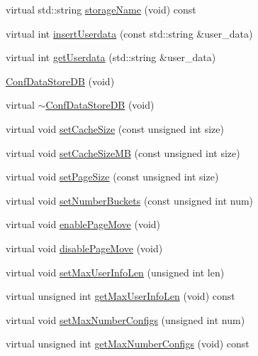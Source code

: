 \begin{DoxyCompactItemize}
virtual std\+::string \mbox{\hyperlink{classFILEDB_1_1ConfDataStoreDB_acac74e3143398de6c5da068f37a762ee}{storage\+Name}} (void) const
\item 
virtual int \mbox{\hyperlink{classFILEDB_1_1ConfDataStoreDB_a8fa05198f3ff1f405fbdfc6a51f43d1a}{insert\+Userdata}} (const std\+::string \&user\+\_\+data)
\item 
virtual int \mbox{\hyperlink{classFILEDB_1_1ConfDataStoreDB_abf7ce0847e1d68f960836826d68c0079}{get\+Userdata}} (std\+::string \&user\+\_\+data)
\item 
\mbox{\hyperlink{classFILEDB_1_1ConfDataStoreDB_a575d901daeccae08bcda5b2a60681e1b}{Conf\+Data\+Store\+DB}} (void)
\item 
virtual \mbox{\hyperlink{classFILEDB_1_1ConfDataStoreDB_a39b48750dbc9bd0d4ca8c9787edee897}{$\sim$\+Conf\+Data\+Store\+DB}} (void)
\item 
virtual void \mbox{\hyperlink{classFILEDB_1_1ConfDataStoreDB_af432d4a9c6dfb21a6ccb1969343cb4fa}{set\+Cache\+Size}} (const unsigned int size)
\item 
virtual void \mbox{\hyperlink{classFILEDB_1_1ConfDataStoreDB_aa5fafbdd147d1b66d8fcc6821dc3804f}{set\+Cache\+Size\+MB}} (const unsigned int size)
\item 
virtual void \mbox{\hyperlink{classFILEDB_1_1ConfDataStoreDB_a50004cb93881959d0846a12d920a95c8}{set\+Page\+Size}} (const unsigned int size)
\item 
virtual void \mbox{\hyperlink{classFILEDB_1_1ConfDataStoreDB_a20a5d092cdcfbca4dbce15b2da006065}{set\+Number\+Buckets}} (const unsigned int num)
\item 
virtual void \mbox{\hyperlink{classFILEDB_1_1ConfDataStoreDB_ae8f437f44366624ac0d5aba306a5ba42}{enable\+Page\+Move}} (void)
\item 
virtual void \mbox{\hyperlink{classFILEDB_1_1ConfDataStoreDB_afcbba500d85f2a92419193183c428a0f}{disable\+Page\+Move}} (void)
\item 
virtual void \mbox{\hyperlink{classFILEDB_1_1ConfDataStoreDB_a02a2fcc79ba97c11b4ec1ec0321e5415}{set\+Max\+User\+Info\+Len}} (unsigned int len)
\item 
virtual unsigned int \mbox{\hyperlink{classFILEDB_1_1ConfDataStoreDB_a0fc37111156b6c7080ff6a6831c847fc}{get\+Max\+User\+Info\+Len}} (void) const
\item 
virtual void \mbox{\hyperlink{classFILEDB_1_1ConfDataStoreDB_acd6f44fc7a83322417ad1a7ea7d2b6ea}{set\+Max\+Number\+Configs}} (unsigned int num)
\item 
virtual unsigned int \mbox{\hyperlink{classFILEDB_1_1ConfDataStoreDB_a89337b5034d8f87b4a37ceb05ea99d3a}{get\+Max\+Number\+Configs}} (void) const

\end{DoxyCompactItemize}
